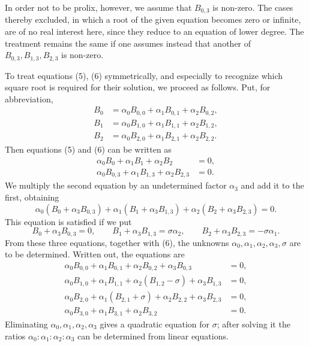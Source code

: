 \documentclass[11pt]{article}
\begin{document}
In order not to be prolix, however, we assume that $B_{0,3}$ is non-zero. The cases thereby excluded, in which a root of the given equation becomes zero or infinite, are of no real interest here, since they reduce to an equation of lower degree. The treatment remains the same if one assumes instead that another of $B_{0,3},B_{1,3},B_{2,3}$ is non-zero.

To treat equations (5), (6) symmetrically, and especially to recognize which square root is required for their solution, we proceed as follows. Put, for abbreviation,
\begin{equation}
\begin{aligned}
B_0&=\alpha_0B_{0,0}+\alpha_1B_{0,1}+\alpha_2B_{0,2},\\
B_1&=\alpha_0B_{1,0}+\alpha_1B_{1,1}+\alpha_2B_{1,2},\\
B_2&=\alpha_0B_{2,0}+\alpha_1B_{2,1}+\alpha_2B_{2,2}.
\end{aligned}
\tag{7}
\end{equation}
Then equations (5) and (6) can be written as
\begin{equation}
\begin{aligned}
\alpha_0B_0+\alpha_1B_1+\alpha_2B_2&=0,\\
\alpha_0B_{0,3}+\alpha_1B_{1,3}+\alpha_2B_{2,3}&=0.
\end{aligned}
\tag{8}
\end{equation}
We multiply the second equation by an undetermined factor $\alpha_3$ and add it to the first, obtaining
\begin{equation}
 \alpha_0(B_0+\alpha_3B_{0,3})+
 \alpha_1(B_1+\alpha_3B_{1,3})+
 \alpha_2(B_2+\alpha_3B_{2,3})=0.
\tag{9}
\end{equation}
This equation is satisfied if we put
\begin{equation}
 B_0+\alpha_3B_{0,3}=0,
 \qquad B_1+\alpha_3B_{1,3}=\sigma\alpha_2,
 \qquad B_2+\alpha_3B_{2,3}=-\sigma\alpha_1.
\tag{10}
\end{equation}
From these three equations, together with (6), the unknowns $\alpha_0,\alpha_1,\alpha_2,\alpha_3,\sigma$ are to be determined. Written out, the equations are
\begin{equation}
\begin{aligned}
\alpha_0B_{0,0}+\alpha_1B_{0,1}+\alpha_2B_{0,2}+\alpha_3B_{0,3}&=0,\\
\alpha_0B_{1,0}+\alpha_1B_{1,1}+\alpha_2(B_{1,2}-\sigma)+\alpha_3B_{1,3}&=0,\\
\alpha_0B_{2,0}+\alpha_1(B_{2,1}+\sigma)+\alpha_2B_{2,2}+\alpha_3B_{2,3}&=0,\\
\alpha_0B_{3,0}+\alpha_1B_{3,1}+\alpha_2B_{3,2}&=0.
\end{aligned}
\tag{11}
\end{equation}
Eliminating $\alpha_0,\alpha_1,\alpha_2,\alpha_3$ gives a quadratic equation for $\sigma$; after solving it the ratios $\alpha_0:\alpha_1:\alpha_2:\alpha_3$ can be determined from linear equations.
\end{document}
